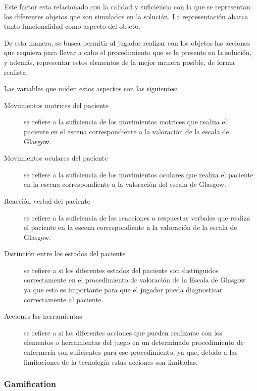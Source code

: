 Este factor esta relacionado con la calidad y suficiencia con la que se
representan los diferentes objetos que son simulados en la solución. La
representación abarca tanto funcionalidad como aspecto del objeto.

De esta manera, se busca permitir al jugador realizar con los objetos las
acciones que requiera para llevar a cabo el procedimiento que se le presente en
la solución, y además, representar estos elementos de la mejor manera posible,
de forma realista.

Las variables que miden estos aspectos son las siguientes:

\begin{description}

\item [Movimientos motrices del paciente] se refiere a la suficiencia de los
    movimientos motrices que realiza el paciente en el escena correspondiente a
    la valoración de la escala de Glasgow.

\item [Movimientos oculares del paciente] se refiere a la suficiencia de los
    movimientos oculares que realiza el paciente en la escena correspondiente a
    la valoración del escala de Glasgow.

\item [Reacción verbal del paciente] se refiere a la suficiencia de las
    reacciones o respuestas verbales que realiza el paciente en la escena
    correspondiente a la valoración de la escala de Glasgow.

\item[Distinción entre los estados del paciente] se refiere a si los diferentes
    estados del paciente son distinguidos correctamente en el procedimiento de
    valoración de la Escala de Glasgow ya que esto es importante para que el
    jugador pueda diagnosticar correctamente al paciente.

\item[Acciones las herramientas] se refiere a si las diferentes acciones que
    pueden realizarse con los elementos o herramientas del juego en un
    determinado procedimiento de enfermería son suficientes para ese
    procedimiento, ya que, debido a las limitaciones de la tecnología estas
    acciones son limitadas.

\end{description}

\subsubsection{Gamification}

